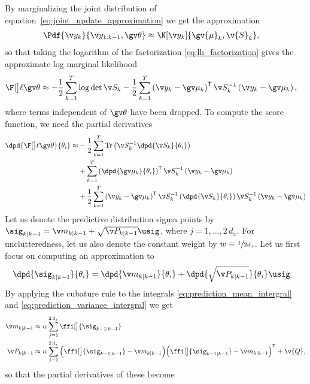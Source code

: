 By marginalizing the joint distribution of equation~\eqref{eq:joint_update_approximation}
we get the approximation
\begin{align}
	\Pdf{\y_k}{\y_{1:k-1},\Th}&\approx \N[\yk]{\gv{\mu}_k,\v{S}_k} ,
\end{align}
so that taking the logarithm of the factorization \eqref{eq:lh_factorization} 
gives the approximate log marginal likelihood 
\begin{align}
	\lLH&\approx
	-\frac{1}{2}\sum_{k=1}^T\log\det{\S}
	-\frac{1}{2}\sum_{k=1}^T
	\left(\yk-\ym\right)^\tr
	\S^{-1}
	\left(\yk-\ym\right),
	\label{eq:nonl_logLH}
\end{align}
where terms independent of $\Th$ have been dropped.
To compute the score function, we need the partial derivatives
\begin{align}
\begin{split}
	\dpd{\lLH}{\theta_i}
	\approx&-\frac{1}{2}\sum_{k=1}^T
	\mathrm{Tr}\left(\S^{-1}\dpd{\S}{\theta_i}\right)\\
	&+\sum_{k=1}^T
	\left(\dpd{\ym}{\theta_i}\right)^\tr\S^{-1}\left(\yk-\ym\right)\\
	&+\frac{1}{2}\sum_{k=1}^T
	\left(\yk-\ym\right)^\tr\S^{-1}\left(\dpd{\S}{\theta_i}\right)\S^{-1}\left(\yk-\ym\right)\\
	\label{eq:nonl_dlogLH}
\end{split}
\end{align}
%
%
Let us denote the predictive distribution sigma points by 
$\sig_{k|k-1}=\m_{k|k-1}+\sqrt{\P_{k|k-1}}\usig$, where $j=1,\dots,2\,d_x$.
For unclutteredness, let us also denote the constant
weight by $w\equiv \sfrac{1}{2d_x}$. Let us first focus on computing
an approximation to 
\begin{align}
	\dpd{\sig_{k|k-1}}{\theta_i}&= \dpd{\m_{k|k-1}}{\theta_i}+ \dpd{\sqrt{\P_{k|k-1}}}{\theta_i}\usig
	\label{eq:dSig_pred}
\end{align}
By applying the cubature rule to the integrals \eqref{eq:prediction_mean_intergral} and 
\eqref{eq:prediction_variance_intergral} 
we get   
%
\begin{align}
	\m_{k|k-1} &\approx{} w \sum_{j=1}^{2\,d_x} \ffi[\big]{\sig_{k-1|k-1}} \\
	\P_{k|k-1} &\approx{} w \sum_{j=1}^{2\,d_x}%
	\Big(\ffi[\big]{\sig_{k-1|k-1}}-\m_{k|k-1}\Big)%
	\Big(\ffi[\big]{\sig_{k-1|k-1}}-\m_{k|k-1}\Big)^\tr%
	+\v{Q},
	\label{tablelabel}
\end{align}
so that the partial derivatives of these become

